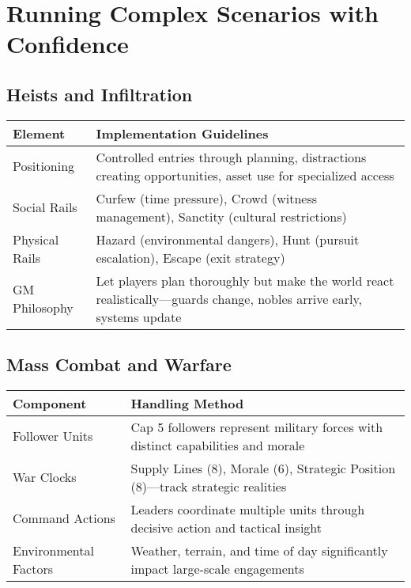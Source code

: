 \section*{Running Complex Scenarios with Confidence}

\subsection*{Heists and Infiltration}

\begin{fatebox}
\begin{tabularx}{\textwidth}{lX}
\toprule
\textbf{Element} & \textbf{Implementation Guidelines} \\
\midrule
Positioning & Controlled entries through planning, distractions creating opportunities, asset use for specialized access \\
Social Rails & Curfew (time pressure), Crowd (witness management), Sanctity (cultural restrictions) \\
Physical Rails & Hazard (environmental dangers), Hunt (pursuit escalation), Escape (exit strategy) \\
GM Philosophy & Let players plan thoroughly but make the world react realistically—guards change, nobles arrive early, systems update \\
\bottomrule
\end{tabularx}
\end{fatebox}

\subsection*{Mass Combat and Warfare}

\begin{fatebox}
\begin{tabularx}{\textwidth}{lX}
\toprule
\textbf{Component} & \textbf{Handling Method} \\
\midrule
Follower Units & Cap 5 followers represent military forces with distinct capabilities and morale \\
War Clocks & Supply Lines (8), Morale (6), Strategic Position (8)—track strategic realities \\
Command Actions & Leaders coordinate multiple units through decisive action and tactical insight \\
Environmental Factors & Weather, terrain, and time of day significantly impact large-scale engagements \\
\bottomrule
\end{tabularx}
\end{fatebox}

